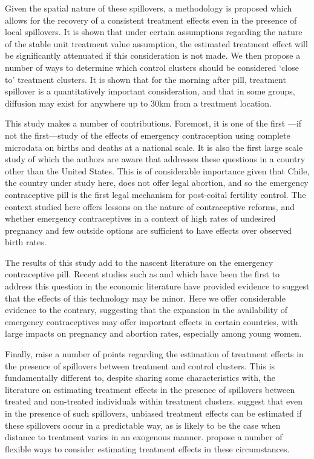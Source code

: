 Given the spatial nature of these spillovers, a methodology is proposed which
allows for the recovery of a consistent treatment effects even in the presence
of local spillovers.  It is shown that under certain assumptions regarding the
nature of the stable unit treatment value assumption, the estimated treatment 
effect will be significantly attenuated if this consideration is not made.
We then propose a number of ways to determine which control clusters should
be considered `close to' treatment clusters.  It is shown that for the morning
after pill, treatment spillover is a quantitatively important consideration,
and that in some groups, diffusion may exist for anywhere up to 30km from a
treatment location.

This study makes a number of contributions.  Foremost, it is one of the first%
---if not the first---study of the effects of emergency contraception using 
complete microdata on births and deaths at a national scale. It is also the first 
large scale study of which the authors are aware that addresses these questions 
in a country other than the United States.  This is of considerable importance 
given that Chile, the country under study here, does not offer legal abortion, 
and so the emergency contraceptive pill is the first legal mechanism for 
post-coital fertility control.  The context studied here offers lessons on the 
nature of contraceptive reforms, and whether emergency contraceptives in a 
context of high rates of undesired pregnancy and few outside options are 
sufficient to have effects over observed birth rates.

The results of this study add to the nascent literature on the emergency 
contraceptive pill.  Recent studies such as \citet{Grossetal2014} and 
\citet{Durrance2013} which have been the first to address this question in 
the economic literature have provided evidence to suggest that the effects of 
this technology may be minor.  Here we offer considerable evidence to the 
contrary, suggesting that the expansion in the availability of emergency 
contraceptives may offer important effects in certain countries, with large 
impacts on pregnancy and abortion rates, especially among young women.

Finally, \person raise a number of points regarding the estimation of 
treatment effects in the presence of spillovers between treatment and control
clusters.  This is fundamentally different to, despite sharing some 
characteristics with, the literature on estimating treatment effects in the 
presence of spillovers between treated and non-treated individuals within 
treatment clusters.  \Person suggest that even in the presence of such 
spillovers, unbiased treatment effects can be estimated if these spillovers
occur in a predictable way, as is likely to be the case when distance to 
treatment varies in an exogenous manner. \Person propose a number of flexible
ways to consider estimating treatment effects in these circumstances.

